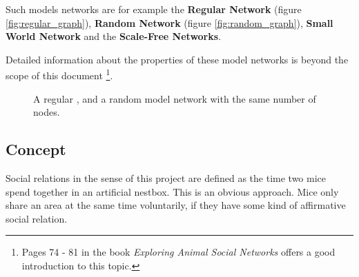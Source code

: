Such models networks are for example the \textbf{Regular Network} (figure \ref{fig:regular_graph}), \textbf{Random Network} (figure \ref{fig:random_graph}), \textbf{Small World Network} and the \textbf{Scale-Free Networks}.

Detailed information about the properties of these model networks is beyond the scope of this document \footnote{Pages 74 - 81 in the book \textit{Exploring Animal Social Networks}\cite{croft:07} offers a good introduction to this topic.}.

\begin{figure}[htpb]%
	\centering 
	\qquad 
	\caption[A regular and a random model network]{A regular , and a random  model network with the same number of nodes.} 
	 
\end{figure} 

\subsection{Concept}
\label{subsec:graph_concept}

Social relations in the sense of this project are defined as the time two mice spend together in an artificial nestbox. This is an obvious approach. Mice only share an area at the same time voluntarily, if they have some kind of affirmative social relation.

